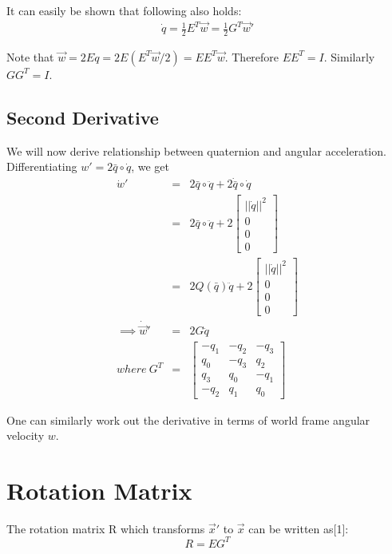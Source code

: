 \documentclass{article}
\begin{document}
	It can easily be shown that following also holds:
	\begin{eqnarray}
		\dot{q} = \frac{1}{2}E^T\vec{w} = \frac{1}{2}G^T\vec{w}'
	\end{eqnarray}
	
	Note that $\vec{w}=2E\dot{q}=2E(E^T\vec{w}/2)=EE^T\vec{w}$. Therefore $EE^T=I$. Similarly $GG^T=I$.	
	
	\subsection{Second Derivative}
	
	We will now derive relationship between quaternion and angular acceleration. Differentiating $w'=2\bar{q}\circ \dot{q}$, we get
	\begin{eqnarray}
		\dot{w}' &=& 2\bar{q}\circ\ddot{q} + 2\dot{\bar{q}}\circ\dot{q}\\
		 &=& 2\bar{q}\circ\ddot{q} + 2\begin{bmatrix}
		 ||\dot{q}||^2\\0\\0\\0
		 \end{bmatrix}\\
		 &=& 2Q(\bar{q})\ddot{q} + 2\begin{bmatrix}
		 ||\dot{q}||^2\\0\\0\\0
		 \end{bmatrix}\\
		 \implies \dot{\vec{w}}' &=& 2G\ddot{q}\\
		 where~ G^T &=& \begin{bmatrix}
		   -q_1 & -q_2 & -q_3\\
		   q_0 & -q_3 & q_2 \\
		   q_3 & q_0 & -q_1\\
		   -q_2 & q_1 & q_0
		   \end{bmatrix}
	\end{eqnarray}
	
	One can similarly work out the derivative in terms of world frame angular velocity $w$.
	
	\section{Rotation Matrix}
	
		The rotation matrix R which transforms $\vec{x}'$ to $\vec{x}$ can be written as[1]:
		\begin{equation}
		R = EG^T		
		\end{equation}
		
\end{document}
